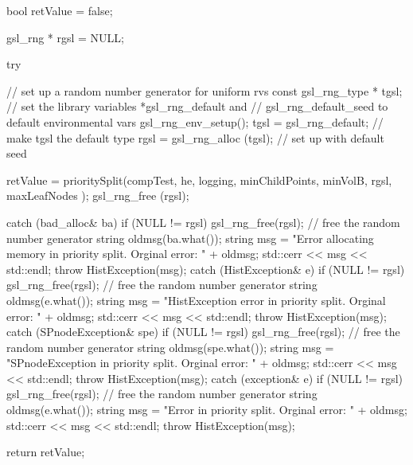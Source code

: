 \begin{DoxyCode}
{
    bool retValue = false;

    gsl_rng * rgsl = NULL;

    try {
        // set up a random number generator for uniform rvs
        const gsl_rng_type * tgsl;
        // set the library variables *gsl_rng_default and
        // gsl_rng_default_seed to default environmental vars
        gsl_rng_env_setup();
        tgsl = gsl_rng_default; // make tgsl the default type
        rgsl = gsl_rng_alloc (tgsl); // set up with default seed

        retValue = prioritySplit(compTest, he, logging,
                                    minChildPoints, minVolB, rgsl, maxLeafNodes
      );
        gsl_rng_free (rgsl);
    }

    catch (bad_alloc& ba) {
        if (NULL != rgsl) gsl_rng_free(rgsl); // free the random number
       generator
        string oldmsg(ba.what());
        string msg = "Error allocating memory in priority split.  Orginal
       error: "
                                     + oldmsg;
        std::cerr << msg << std::endl;
        throw HistException(msg);
    }
    catch (HistException& e) {
        if (NULL != rgsl) gsl_rng_free(rgsl); // free the random number
       generator
        string oldmsg(e.what());
        string msg = "HistException error in priority split.  Orginal error: "
                                    + oldmsg;
        std::cerr << msg << std::endl;
        throw HistException(msg);
    }
    catch (SPnodeException& spe) {
        if (NULL != rgsl) gsl_rng_free(rgsl); // free the random number
       generator
        string oldmsg(spe.what());
        string msg = "SPnodeException in priority split.  Orginal error: "
                                    + oldmsg;
        std::cerr << msg << std::endl;
        throw HistException(msg);
    }
    catch (exception& e) {
        if (NULL != rgsl) gsl_rng_free(rgsl); // free the random number
       generator
        string oldmsg(e.what());
        string msg = "Error in priority split.  Orginal error: " + oldmsg;
        std::cerr << msg << std::endl;
        throw HistException(msg);
    }

    return retValue;
}
\end{DoxyCode}
